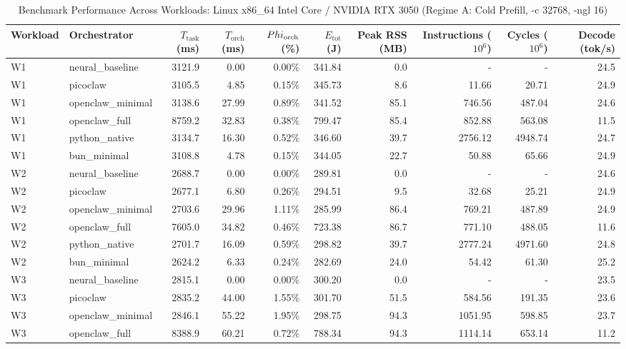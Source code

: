 \begin{table}[t]
\centering\small
\caption{Benchmark Performance Across Workloads: Linux x86_64 Intel Core / NVIDIA RTX 3050 (Regime A: Cold Prefill, -c 32768, -ngl 16)}
\label{tab:linux_master_summary}
\begin{tabular}{llrrrrrrrr}
\toprule
Workload & Orchestrator & $T_{\text{task}}$ (ms) & $T_{\text{orch}}$ (ms) & $\\Phi_{\text{orch}}$ (\%) & $E_{\text{tot}}$ (J) & Peak RSS (MB) & Instructions ($10^6$) & Cycles ($10^6$) & Decode (tok/s) \\
\midrule
W1 & neural\_baseline & 3121.9 & 0.00 & 0.00\% & 341.84 & 0.0 & - & - & 24.5 \\
W1 & picoclaw & 3105.5 & 4.85 & 0.15\% & 345.73 & 8.6 & 11.66 & 20.71 & 24.9 \\
W1 & openclaw\_minimal & 3138.6 & 27.99 & 0.89\% & 341.52 & 85.1 & 746.56 & 487.04 & 24.6 \\
W1 & openclaw\_full & 8759.2 & 32.83 & 0.38\% & 799.47 & 85.4 & 852.88 & 563.08 & 11.5 \\
W1 & python\_native & 3134.7 & 16.30 & 0.52\% & 346.60 & 39.7 & 2756.12 & 4948.74 & 24.7 \\
W1 & bun\_minimal & 3108.8 & 4.78 & 0.15\% & 344.05 & 22.7 & 50.88 & 65.66 & 24.9 \\
\midrule
W2 & neural\_baseline & 2688.7 & 0.00 & 0.00\% & 289.81 & 0.0 & - & - & 24.6 \\
W2 & picoclaw & 2677.1 & 6.80 & 0.26\% & 294.51 & 9.5 & 32.68 & 25.21 & 24.9 \\
W2 & openclaw\_minimal & 2703.6 & 29.96 & 1.11\% & 285.99 & 86.4 & 769.21 & 487.89 & 24.9 \\
W2 & openclaw\_full & 7605.0 & 34.82 & 0.46\% & 723.38 & 86.7 & 771.10 & 488.05 & 11.6 \\
W2 & python\_native & 2701.7 & 16.09 & 0.59\% & 298.82 & 39.7 & 2777.24 & 4971.60 & 24.8 \\
W2 & bun\_minimal & 2624.2 & 6.33 & 0.24\% & 282.69 & 24.0 & 54.42 & 61.30 & 25.2 \\
\midrule
W3 & neural\_baseline & 2815.1 & 0.00 & 0.00\% & 300.20 & 0.0 & - & - & 23.5 \\
W3 & picoclaw & 2835.2 & 44.00 & 1.55\% & 301.70 & 51.5 & 584.56 & 191.35 & 23.6 \\
W3 & openclaw\_minimal & 2846.1 & 55.22 & 1.95\% & 298.75 & 94.3 & 1051.95 & 598.85 & 23.7 \\
W3 & openclaw\_full & 8388.9 & 60.21 & 0.72\% & 788.34 & 94.3 & 1114.14 & 653.14 & 11.2 \\

\end{tabular}
\end{table}
